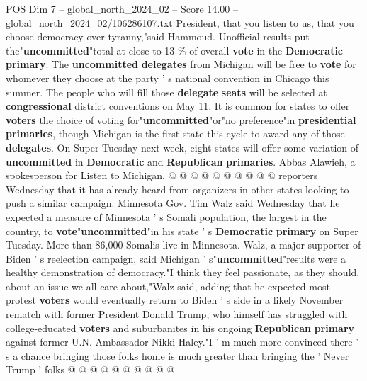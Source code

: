 \begin{textsample}{POS Dim 7 – global\_north\_2024\_02 – Score 14.00 – global\_north\_2024\_02/106286107.txt}
President, that you listen to us, that you choose democracy over tyranny,"said Hammoud.
Unofficial results put the"\textbf{uncommitted}"total at close to 13 \% of overall \textbf{vote} in the \textbf{Democratic} \textbf{primary}.
The \textbf{uncommitted} \textbf{delegates} from Michigan will be free to \textbf{vote} for whomever they choose at the party ' s national convention in Chicago this summer.
The people who will fill those \textbf{delegate} \textbf{seats} will be selected at \textbf{congressional} district conventions on May 11.
It is common for states to offer \textbf{voters} the choice of voting for"\textbf{uncommitted}"or"no preference"in \textbf{presidential} \textbf{primaries}, though Michigan is the first state this cycle to award any of those \textbf{delegates}.
On Super Tuesday next week, eight states will offer some variation of \textbf{uncommitted} in \textbf{Democratic} and \textbf{Republican} \textbf{primaries}.
Abbas Alawieh, a spokesperson for Listen to Michigan, @ @ @ @ @ @ @ @ @ @ reporters Wednesday that it has already heard from organizers in other states looking to push a similar campaign.
Minnesota Gov.
Tim Walz said Wednesday that he expected a measure of Minnesota ' s Somali population, the largest in the country, to \textbf{vote}"\textbf{uncommitted}"in his state ' s \textbf{Democratic} \textbf{primary} on Super Tuesday.
More than 86,000 Somalis live in Minnesota.
Walz, a major supporter of Biden ' s reelection campaign, said Michigan ' s"\textbf{uncommitted}"results were a healthy demonstration of democracy."I think they feel passionate, as they should, about an issue we all care about,"Walz said, adding that he expected most protest \textbf{voters} would eventually return to Biden ' s side in a likely November rematch with former President Donald Trump, who himself has struggled with college-educated \textbf{voters} and suburbanites in his ongoing \textbf{Republican} \textbf{primary} against former U.N.
Ambassador Nikki Haley."I ' m much more convinced there ' s a chance bringing those folks home is much greater than bringing the ' Never Trump ' folks @ @ @ @ @ @ @ @ @ @

\end{textsample}
